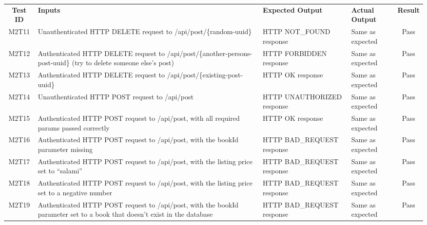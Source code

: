 \documentclass[fullpage]{article}
\begin{document}
\begin{table}[H]
\flushleft
\begin{tabular}{|c|p{4.5cm}|p{3.6cm}|p{3.6cm}|c|}
\hline
 \rowcolor{lightgray}
\textbf{Test ID} &\textbf{Inputs} &\textbf{Expected Output} &\textbf{Actual Output} &\textbf{Result}\\
M2T11 & Unauthenticated HTTP DELETE request to /api/post/\{random-uuid\} & HTTP NOT\_FOUND response & Same as expected &  Pass \\
\hline
M2T12 & Authenticated HTTP DELETE request to /api/post/\{another-persons-post-uuid\} (try to delete someone else's post) & HTTP FORBIDDEN response & Same as expected & Pass \\
\hline
M2T13 & Authenticated HTTP DELETE request to /api/post/\{existing-post-uuid\} & HTTP OK response & Same as expected & Pass \\
\hline
M2T14 & Unauthenticated HTTP POST request to /api/post & HTTP UNAUTHORIZED response & Same as expected & Pass \\
\hline
M2T15 & Authenticated HTTP POST request to /api/post, with all required params passed correctly & HTTP OK response & Same as expected & Pass \\
\hline
M2T16 & Authenticated HTTP POST request to /api/post, with the bookId parameter missing & HTTP BAD\_REQUEST response & Same as expected & Pass \\
\hline
M2T17 & Authenticated HTTP POST request to /api/post, with the listing price set to ``salami'' & HTTP BAD\_REQUEST response & Same as expected & Pass \\
\hline
M2T18 & Authenticated HTTP POST request to /api/post, with the listing price set to a negative number & HTTP BAD\_REQUEST response & Same as expected & Pass \\
\hline
M2T19 & Authenticated HTTP POST request to /api/post, with the bookId parameter set to a book that doesn't exist in the database & HTTP BAD\_REQUEST response & Same as expected & Pass \\
\hline

\end{tabular}
\end{table}
\end{document}
